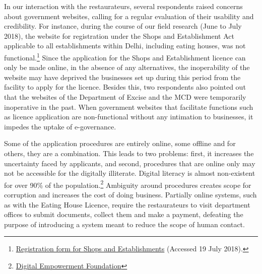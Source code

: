 \documentclass[a4paper, 12pt]{article}
\begin{document}
		In our interaction with the restaurateurs, several respondents raised concerns about government websites, calling for a regular evaluation of their usability and credibility. For instance, during the course of our field research (June to July 2018), the website for registration under the Shops and Establishment Act applicable to all establishments within Delhi, including eating houses, was not functional.\footnote{\href{https://bit.ly/2xfB6UJ}{Registration form for Shops and Establishments} (Accessed 19 July 2018).} Since the application for the Shops and Establishment licence can only be made online, in the absence of any alternatives, the inoperability of the website may have deprived the businesses set up during this period from the facility to apply for the licence. Besides this, two respondents also pointed out that the websites of the Department of Excise and the MCD were temporarily inoperative in the past. When government websites that facilitate functions such as licence application are non-functional without any intimation to businesses, it impedes the uptake of e-governance.
		
		Some of the application procedures are entirely online, some offline and for others, they are a combination. This leads to two problems: first, it increases the uncertainty faced by applicants, and second, procedures that are online only may not be accessible for the digitally illiterate. Digital literacy is almost non-existent for over 90\% of the population.\footnote{\href{https://bit.ly/2NMWdaj}{Digital Empowerment Foundation}}  Ambiguity around procedures creates scope for corruption and increases the cost of doing business. Partially online systems, such as with the Eating House Licence, require the restaurateurs to visit department offices to submit documents, collect them and make a payment, defeating the purpose of introducing a system meant to reduce the scope of human contact.
		
\end{document}
